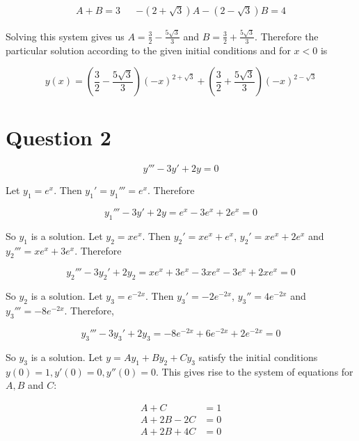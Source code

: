 \documentclass{article}
\begin{document}
\begin{align*}
    A + B = 3 && -(2 + \sqrt{3})A - (2 - \sqrt{3})B = 4
\end{align*}

Solving this system gives us $A = \frac{3}{2} - \frac{5\sqrt{3}}{3}$ and $B = \frac{3}{2} + \frac{5\sqrt{3}}{3}$. Therefore the particular solution according to
the given initial conditions and for $x < 0$ is

\begin{equation*}
    y(x) = \left(\frac{3}{2} - \frac{5\sqrt{3}}{3}\right)(-x)^{2 + \sqrt{3}} + \left(\frac{3}{2} + \frac{5\sqrt{3}}{3}\right)(-x)^{2 - \sqrt{3}}
\end{equation*}

\section*{Question 2}

\begin{equation} \label{eq:2-1}
    y''' - 3y' + 2y = 0
\end{equation}

Let $y_1 = e^x$. Then $y_1' = y_1''' = e^x$. Therefore

\begin{equation*}
    y_1''' - 3y' + 2y = e^x - 3e^x + 2e^x = 0
\end{equation*}

So $y_1$ is a solution. Let $y_2 = xe^x$. Then $y_2' = xe^x + e^x$, $y_2' = xe^x + 2e^x$ and $y_2''' = xe^x + 3e^x$. Therefore

\begin{equation*}
    y_2''' - 3y_2' + 2y_2 = xe^x + 3e^x - 3xe^x - 3e^x + 2xe^x = 0
\end{equation*}

So $y_2$ is a solution. Let $y_3 = e^{-2x}$. Then $y_3' = -2e^{-2x}$, $y_3'' = 4e^{-2x}$ and $y_3''' = -8e^{-2x}$. Therefore,

\begin{equation*}
    y_3''' - 3y_3' + 2y_3 = -8e^{-2x} + 6e^{-2x} + 2e^{-2x} = 0
\end{equation*}

So $y_3$ is a solution. Let $y = Ay_1 + By_2 + Cy_3$ satisfy the initial conditions $y(0) = 1, y'(0) = 0, y''(0) = 0$. This gives rise to the system of equations
for $A, B$ and $C$:

\begin{align*}
    A + C &= 1\\
    A + 2B - 2C &= 0\\
    A + 2B + 4C &= 0
\end{align*}
\end{document}
